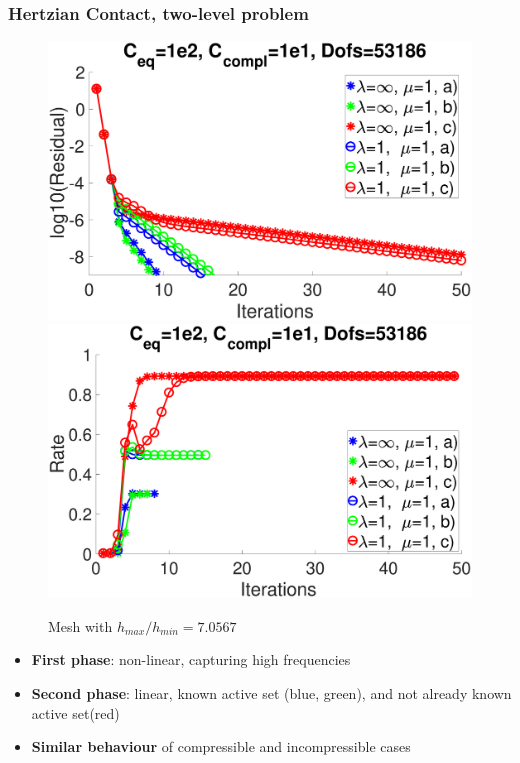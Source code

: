 \documentclass[8pt, oneside]{beamer}   	%
\begin{document}
\begin{frame}
\frametitle{\textbf{Hertzian Contact, two-level problem}}
\begin{figure}[htbp!]
	\includegraphics[scale=0.08]{img/ResidualsNonUniform.eps}
		\includegraphics[scale=0.08]{img/RatesNonUniform.eps}
	\caption{Mesh with $h_{max}/h_{min}=7.0567$}
		\label{ResidualRateVeryNonUniform}
\end{figure}
\begin{itemize}
\item \textbf{First phase}: non-linear, capturing high frequencies
\item \textbf{Second phase}: linear, known active set (blue, green), and not already known active set(red)
\item  \textbf{Similar behaviour} of compressible and incompressible cases
\end{itemize}
\end{frame}
\end{document}
